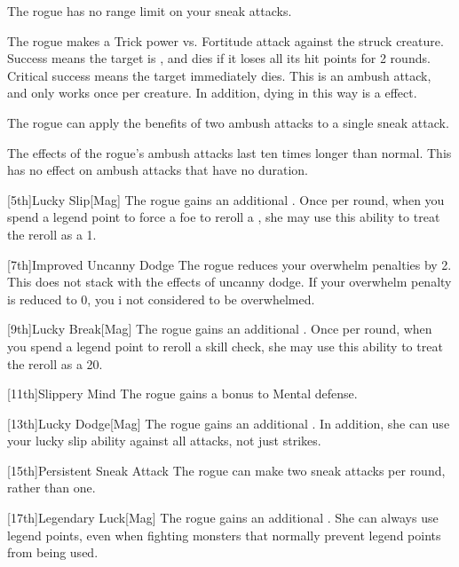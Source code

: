         The rogue has no range limit on your sneak attacks.

        The rogue makes a Trick power vs. Fortitude attack against the struck creature.
        Success means the target is \staggered, and dies if it loses all its hit points for 2 rounds.
        Critical success means the target immediately dies.
        This is an ambush attack, and only works once per creature.
        In addition, dying in this way is a  effect.

        The rogue can apply the benefits of two ambush attacks to a single sneak attack.

        The effects of the rogue's ambush attacks last ten times longer than normal.
        This has no effect on ambush attacks that have no duration.

        [5th]{Lucky Slip}[Mag]
        The rogue gains an additional .
        Once per round, when you spend a legend point to force a foe to reroll a , she may use this ability to treat the reroll as a 1.

        [7th]{Improved Uncanny Dodge}
        The rogue reduces your overwhelm penalties by 2.
        This does not stack with the effects of uncanny dodge.
        If your overwhelm penalty is reduced to 0, you i not considered to be overwhelmed.

        [9th]{Lucky Break}[Mag]
        The rogue gains an additional .
        Once per round, when you spend a legend point to reroll a skill check, she may use this ability to treat the reroll as a 20.

        [11th]{Slippery Mind}
        The rogue gains a  bonus to Mental defense.

        [13th]{Lucky Dodge}[Mag]
        The rogue gains an additional .
        In addition, she can use your lucky slip ability against all attacks, not just strikes.

        [15th]{Persistent Sneak Attack}
        The rogue can make two sneak attacks per round, rather than one.

        [17th]{Legendary Luck}[Mag]
        The rogue gains an additional .
        She can always use legend points, even when fighting monsters that normally prevent legend points from being used.

